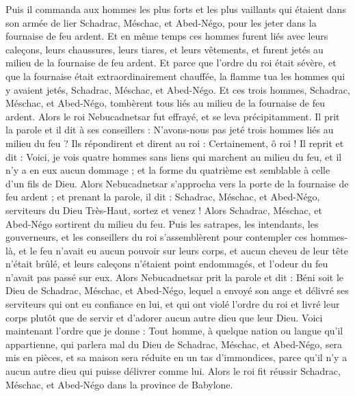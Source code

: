 \begin{multicols}{2}
Puis il commanda aux hommes les plus forts et les plus vaillants qui étaient dans son armée de lier Schadrac, Méschac, et Abed-Négo, pour les jeter dans la fournaise de feu ardent.
Et en même temps ces hommes furent liés avec leurs caleçons, leurs chaussures, leurs tiares, et leurs vêtements, et furent jetés au milieu de la fournaise de feu ardent.
Et parce que l'ordre du roi était sévère, et que la fournaise était extraordinairement chauffée, la flamme tua les hommes qui y avaient jetés, Schadrac, Méschac, et Abed-Négo.
Et ces trois hommes, Schadrac, Méschac, et Abed-Négo, tombèrent tous liés au milieu de la fournaise de feu ardent.
Alors le roi Nebucadnetsar fut effrayé, et se leva précipitamment. Il prit la parole et il dit à ses conseillers : N'avons-nous pas jeté trois hommes liés au milieu du feu ? Ils répondirent et dirent au roi : Certainement, ô roi !
Il reprit et dit : Voici, je vois quatre hommes sans liens qui marchent au milieu du feu, et il n'y a en eux aucun dommage ; et la forme du quatrième est semblable à celle d'un fils de Dieu.
Alors Nebucadnetsar s'approcha vers la porte de la fournaise de feu ardent ; et prenant la parole, il dit : Schadrac, Méschac, et Abed-Négo, serviteurs du Dieu Très-Haut, sortez et venez ! Alors Schadrac, Méschac, et Abed-Négo sortirent du milieu du feu.
Puis les satrapes, les intendants, les gouverneurs, et les conseillers du roi s'assemblèrent pour contempler ces hommes-là, et le feu n'avait eu aucun pouvoir sur leurs corps, et aucun cheveu de leur tête n'était brûlé, et leurs caleçons n'étaient point endommagés, et l'odeur du feu n'avait pas passé sur eux.
Alors Nebucadnetsar prit la parole et dit : Béni soit le Dieu de Schadrac, Méschac, et Abed-Négo, lequel a envoyé son ange et délivré ses serviteurs qui ont eu confiance en lui, et qui ont violé l'ordre du roi et livré leur corps plutôt que de servir et d'adorer aucun autre dieu que leur Dieu.
Voici maintenant l'ordre que je donne : Tout homme, à quelque nation ou langue qu'il appartienne, qui parlera mal du Dieu de Schadrac, Méschac, et Abed-Négo, sera mis en pièces, et sa maison sera réduite en un tas d'immondices, parce qu'il n'y a aucun autre dieu qui puisse délivrer comme lui.
Alors le roi fit réussir Schadrac, Méschac, et Abed-Négo dans la province de Babylone.

\end{multicols}

